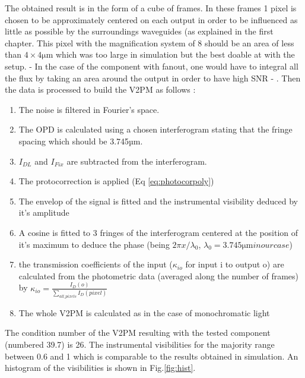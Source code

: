 The obtained result is in the form of a cube of frames. In these frames 1 pixel is chosen to be approximately centered on each output in order to be influenced as little as possible by the surroundings waveguides (as explained in the first chapter. This pixel with the magnification system of 8 should be an area of less than $4\times 4 \si{\micro\meter}$ which was too large in simulation but the best doable at with the setup. - In the case of the component with fanout, one would have to integral all the flux by taking an area around the output in order to have high SNR - . Then the data is processed to build the V2PM as follows :
\begin{enumerate}
 \item The noise is filtered in Fourier's space.
 \item The OPD is calculated using a chosen interferogram stating that the fringe spacing which should be 3.745µm.
 \item $I_{DL}$ and $I_{Fix}$ are subtracted from the interferogram.
 \item The protocorrection is applied (Eq \ref{eq:photocorpoly})
 \item The envelop of the signal is fitted and the instrumental visibility deduced by it's amplitude
 \item A cosine is fitted to 3 fringes of the interferogram centered at the position of it's maximum to deduce the phase (being $2\pi x/\lambda_0$, $\lambda_0 = 3.745\si{\micro\meter} in our case$)
 \item the transmission coefficients of the input ($\kappa_{io}$ for input i to output o) are calculated from the photometric data (averaged along the number of frames) by $\kappa_{io} = \frac{I_D(o)}{\sum_{all\_pixels}{I_D(pixel)}}$
 \item The whole V2PM is calculated as in the case of monochromatic light
\end{enumerate}

The condition number of the V2PM resulting with the tested component (numbered 39.7) is 26. The instrumental visibilities for the majority range between 0.6 and 1 which is comparable to the results obtained in simulation. An histogram of the visibilities is shown in Fig.\ref{fig:hist}. 

